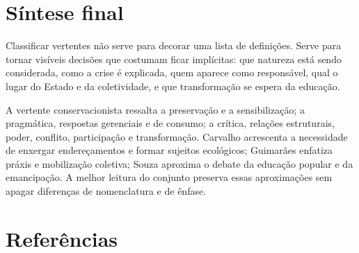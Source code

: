 \documentclass[12pt,a4paper]{article}
\begin{document}
\section{Síntese final}

Classificar vertentes não serve para decorar uma lista de definições. Serve para tornar visíveis decisões que costumam ficar implícitas: que natureza está sendo considerada, como a crise é explicada, quem aparece como responsável, qual o lugar do Estado e da coletividade, e que transformação se espera da educação.

A vertente conservacionista ressalta a preservação e a sensibilização; a pragmática, respostas gerenciais e de consumo; a crítica, relações estruturais, poder, conflito, participação e transformação. Carvalho acrescenta a necessidade de enxergar endereçamentos e formar sujeitos ecológicos; Guimarães enfatiza práxis e mobilização coletiva; Souza aproxima o debate da educação popular e da emancipação. A melhor leitura do conjunto preserva essas aproximações sem apagar diferenças de nomenclatura e de ênfase.

\section{Referências}
\end{document}
